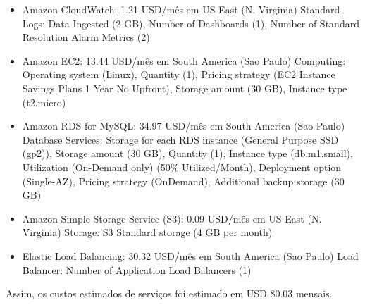 \documentclass[
    12pt,               %
    openright,          %
    oneside,
    a4paper,            %
    BIBLATEX,           %
    TODO,               %
    english,            %
    brazil              %
    ]{ifsp-spo-inf-ctds}
\begin{document}
            \begin{itemize}
            
                \item Amazon CloudWatch: 1.21 USD/mês em US East (N. Virginia) Standard Logs: Data Ingested (2 GB), Number of Dashboards (1), Number of Standard Resolution Alarm Metrics (2)
                
                \item Amazon EC2: 13.44 USD/mês em South America (Sao Paulo) Computing: Operating system (Linux), Quantity (1), Pricing strategy (EC2 Instance Savings Plans 1 Year No Upfront), Storage amount (30 GB), Instance type (t2.micro)
                
                \item Amazon RDS for MySQL: 34.97 USD/mês em South America (Sao Paulo) Database Services: Storage for each RDS instance (General Purpose SSD (gp2)), Storage amount (30 GB), Quantity (1), Instance type (db.m1.small), Utilization (On-Demand only) (50\% Utilized/Month), Deployment option (Single-AZ), Pricing strategy (OnDemand), Additional backup storage (30 GB)
                
                \item Amazon Simple Storage Service (S3): 0.09 USD/mês em US East (N. Virginia) Storage: S3 Standard storage (4 GB per month)
                
                \item Elastic Load Balancing: 30.32 USD/mês em South America (Sao Paulo) Load Balancer: Number of Application Load Balancers (1)
                
            \end{itemize}
    
    
            Assim, os custos estimados de serviços foi estimado em USD 80.03 mensais.
        
\end{document}
